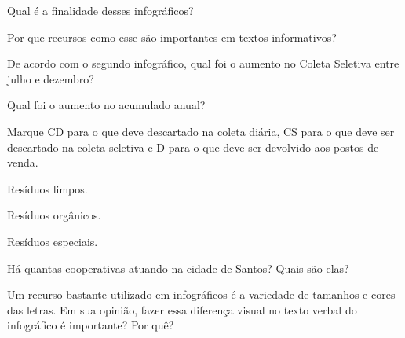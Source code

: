 \begin{escolha}
\begin{escolha}
\item Qual é a finalidade desses infográficos?


\item Por que recursos como esse são importantes em textos informativos?


\item De acordo com o segundo infográfico, qual foi o aumento no Coleta
Seletiva entre julho e dezembro?


\item Qual foi o aumento no acumulado anual?


\item Marque CD para o que deve descartado na coleta diária, CS para o que
deve ser descartado na coleta seletiva e D para o que deve ser devolvido
aos postos de venda.

\begin{boxlist}
\boxlist[\rosa{CS}] Resíduos limpos.

\boxlist[\rosa{CD}] Resíduos orgânicos.

\boxlist[\rosa{D}] Resíduos especiais.
\end{boxlist}

\item Há quantas cooperativas atuando na cidade de Santos? Quais são elas?


\item Um recurso bastante utilizado em infográficos é a variedade de
tamanhos e cores das letras. Em sua opinião, fazer essa diferença visual
no texto verbal do infográfico é importante? Por quê?

\end{escolha}


\end{escolha}
